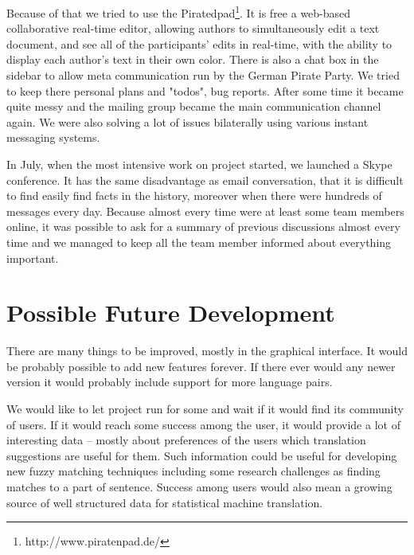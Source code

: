 Because of that we tried to use the Piratedpad\footnote{http://www.piratenpad.de/}. It is free a web-based collaborative real-time editor, allowing authors to simultaneously edit a text document, and see all of the participants' edits in real-time, with the ability to display each author's text in their own color. There is also a chat box in the sidebar to allow meta communication run by the German Pirate Party. We tried to keep there personal plans and "todos", bug reports. After some time it became quite messy and the mailing group became the main communication channel again. We were also solving a lot of issues bilaterally using various instant messaging systems.

In July, when the most intensive work on project started, we launched a Skype conference. It has the same disadvantage as email conversation, that it is difficult to find easily find facts in the history, moreover when there were hundreds of messages every day. Because almost every time were at least some team members online, it was possible to ask for a summary of previous discussions almost every time and we managed to keep all the team member informed about everything important.

\section{Possible Future Development}

There are many things to be improved, mostly in the graphical interface. It would be probably possible to add new features forever. If there ever would any newer version it would probably include support for more language pairs.

We would like to let project run for some and wait if it would find its community of users. If it would reach some success among the user, it would provide a lot of interesting data -- mostly about preferences of the users which translation suggestions are useful for them. Such information could be useful for developing new fuzzy matching techniques including some research challenges as finding matches to a part of sentence. Success among users would also mean a growing source of well structured data for statistical machine translation.